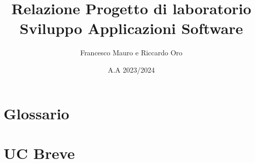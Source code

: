 \documentclass[letterpaper]{report}
\title{Relazione Progetto di laboratorio\\ Sviluppo Applicazioni Software}
\author{Francesco Mauro e Riccardo Oro}
\date{A.A 2023/2024}
\begin{document}
\maketitle
\chapter{Glossario}

\chapter{UC Breve}


\end{document}
